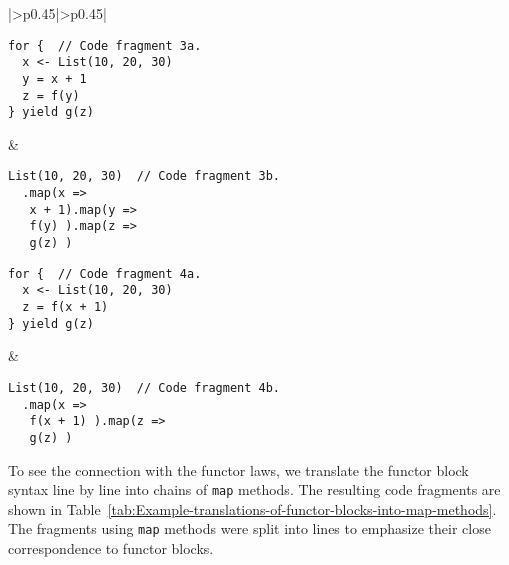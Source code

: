 \begin{table}
\begin{centering}
\begin{tabular}{|>{\centering}p{0.45\textwidth}|>{\centering}p{0.45\textwidth}|}
\begin{minipage}[t]{1.06\linewidth}%
\vspace{-0.86\baselineskip}
\begin{lstlisting}
for {  // Code fragment 3a.
  x <- List(10, 20, 30)
  y = x + 1
  z = f(y)
} yield g(z)
\end{lstlisting}
\vspace{-0.25\baselineskip}
%
\end{minipage} & \hspace*{-0.0278\linewidth}%
\begin{minipage}[t]{1.06\linewidth}%
\vspace{-0.86\baselineskip}
\begin{lstlisting}
List(10, 20, 30)  // Code fragment 3b.
  .map(x =>
   x + 1).map(y =>
   f(y) ).map(z =>
   g(z) )
\end{lstlisting}
\vspace{-0.25\baselineskip}
%
\end{minipage}\tabularnewline
\hline 
\hspace*{-0.0278\linewidth}%
\begin{minipage}[t]{1.06\linewidth}%
\vspace{-0.86\baselineskip}
\begin{lstlisting}
for {  // Code fragment 4a.
  x <- List(10, 20, 30)
  z = f(x + 1)
} yield g(z)
\end{lstlisting}
\vspace{-0.1\baselineskip}
%
\end{minipage} & \hspace*{-0.0278\linewidth}%
\begin{minipage}[t]{1.06\linewidth}%
\vspace{-0.86\baselineskip}
\begin{lstlisting}
List(10, 20, 30)  // Code fragment 4b.
  .map(x =>
   f(x + 1) ).map(z =>
   g(z) )
\end{lstlisting}
\vspace{-0.1\baselineskip}
%
\end{minipage}\tabularnewline
\hline 
\end{tabular}
\par\end{centering}
\caption{Example translations of functor blocks into \lstinline!map! methods.\label{tab:Example-translations-of-functor-blocks-into-map-methods}}
\end{table}

To see the connection with the functor laws, we translate the functor
block syntax line by line into chains of \lstinline!map! methods.
The resulting code fragments are shown in Table~\ref{tab:Example-translations-of-functor-blocks-into-map-methods}.
The fragments using \lstinline!map! methods were split into lines
to emphasize their close correspondence to functor blocks.

